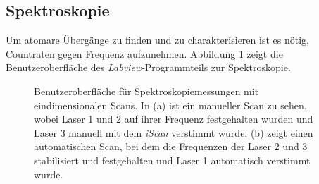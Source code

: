 \subsection{Spektroskopie}\label{subsec:spektroskopie_software}
Um atomare Übergänge zu finden und zu charakterisieren ist es nötig, Countraten
gegen Frequenz aufzunehmen. Abbildung \ref{fig:spektroskopie_benutzeroberflaeche}
zeigt die Benutzeroberfläche des \textit{Labview}-Programmteils zur
Spektroskopie.
\begin{figure}[h]
 	\centering
	\caption[Benutzeroberfläche
	Spektroskopie]{Benutzeroberfläche für Spektroskopiemessungen mit
	eindimensionalen Scans. In (a) ist ein manueller Scan zu sehen, wobei Laser 1
	und 2 auf ihrer Frequenz festgehalten wurden und Laser 3 manuell mit dem
	\textit{iScan} verstimmt wurde. (b) zeigt einen automatischen Scan, bei dem die
	Frequenzen der Laser 2 und 3 stabilisiert und festgehalten und Laser 1
	automatisch verstimmt wurde.}
	\label{fig:spektroskopie_benutzeroberflaeche}
\end{figure}
